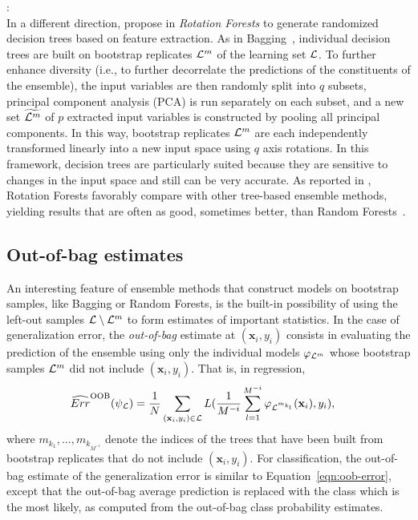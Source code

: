 \begin{description}
\item \citet{rodriguez:2006}: \hfill \\
    In a different direction, \citet{rodriguez:2006} propose in
    \textit{Rotation Forests} to generate randomized decision trees based on
    feature extraction. As in Bagging~\citep{breiman:1996b}, individual decision
    trees are built on bootstrap replicates ${\cal L}^m$ of the learning set
    ${\cal L}$. To further enhance diversity (i.e., to further decorrelate the
    predictions of the constituents of the ensemble), the input variables are
    then randomly split into $q$  subsets, principal component analysis (PCA)
    is run separately on each subset, and a new set $\widetilde{{\cal L}^m}$ of $p$ extracted input
    variables is constructed by pooling all principal components. In this
    way, bootstrap replicates ${\cal L}^m$ are each independently transformed
    linearly into a new input space using $q$  axis rotations. In this
    framework,  decision trees are particularly suited because they are
    sensitive to changes in the input space and still can be very accurate.
    As reported in \citep{rodriguez:2006,kuncheva:2007}, Rotation Forests
    favorably compare with other tree-based ensemble methods, yielding
    results that are often as good, sometimes better, than Random Forests~\citep{breiman:2001}.

\end{description}

\subsection{Out-of-bag estimates}

An interesting  feature of ensemble methods that construct models
on bootstrap samples, like Bagging or Random Forests, is the built-in possibility of
using the left-out samples ${\cal L}\setminus {\cal L}^m$ to form
estimates of important statistics. In the case of generalization error, the
\textit{out-of-bag} estimate at $(\mathbf{x}_i,y_i)$ consists in evaluating the
prediction of the ensemble using only the individual models $\varphi_{{\cal
L}^m}$ whose bootstrap samples ${\cal L}^m$ did not include
$(\mathbf{x}_i,y_i)$. That is, in regression,
\begin{align}\label{eqn:oob-error}
\widehat{Err}^\text{OOB}(\psi_{\cal L}) &= \frac{1}{N} \sum_{(\mathbf{x}_i,y_i) \in {\cal L}} L(\frac{1}{M^{-i}} \sum_{l=1}^{M^{-i}} \varphi_{{\cal L}^{m_{k_l}}}(\mathbf{x}_i), y_i),
\end{align}
where $m_{k_1}, \dots, m_{k_{M^{-i}}}$ denote the indices of the trees that
have been built from bootstrap replicates that do not include $(\mathbf{x}_i,
y_i)$. For classification, the out-of-bag estimate of the generalization error is similar to
Equation~\ref{eqn:oob-error}, except that the out-of-bag average prediction is
replaced with the class which is the most likely, as computed from the out-of-bag
class probability estimates.

